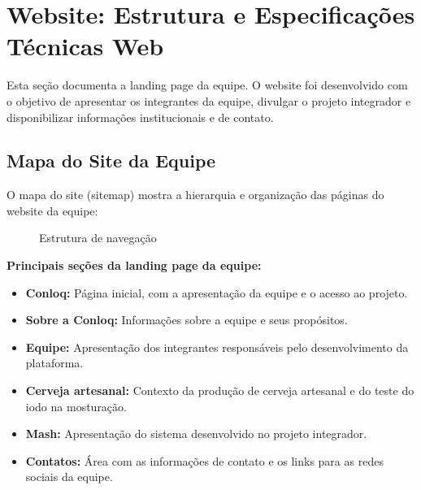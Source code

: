 \section{Website: Estrutura e Especificações Técnicas Web}

Esta seção documenta a landing page da equipe. O website foi desenvolvido com o objetivo de apresentar os integrantes da equipe, divulgar o projeto integrador e disponibilizar informações institucionais e de contato.

\subsection{Mapa do Site da Equipe} O mapa do site (sitemap) mostra a hierarquia e organização das páginas do website da equipe:
\begin{figure}[H]
\centering
{}
\caption{Estrutura de navegação}
\label{fig:sitemap}
\end{figure}

\textbf{Principais seções da landing page da equipe:}

\begin{itemize}

    \item \textbf{Conloq:} Página inicial, com a apresentação da equipe e o acesso ao projeto.

    \item \textbf{Sobre a Conloq:} Informações sobre a equipe e seus propósitos.

    \item \textbf{Equipe:} Apresentação dos integrantes responsáveis pelo desenvolvimento da plataforma.

    \item \textbf{Cerveja artesanal:} Contexto da produção de cerveja artesanal e do teste do iodo na mosturação.

    \item \textbf{Mash:} Apresentação do sistema desenvolvido no projeto integrador.

    \item \textbf{Contatos:} Área com as informações de contato e os links para as redes sociais da equipe.

\end{itemize}

